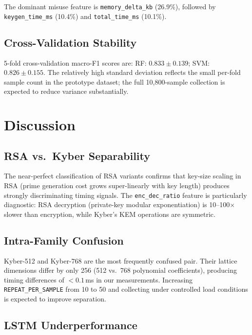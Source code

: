 \documentclass[conference]{IEEEtran}
\begin{document}
The dominant misuse feature is \texttt{memory\_delta\_kb} (26.9\%),
followed by \texttt{keygen\_time\_ms} (10.4\%) and
\texttt{total\_time\_ms} (10.1\%).

\subsection{Cross-Validation Stability}

5-fold cross-validation macro-F1 scores are:
RF: $0.833 \pm 0.139$;
SVM: $0.826 \pm 0.155$.
The relatively high standard deviation reflects the small per-fold
sample count in the prototype dataset; the full 10{,}800-sample
collection is expected to reduce variance substantially.

\section{Discussion}

\subsection{RSA vs.\ Kyber Separability}

The near-perfect classification of RSA variants confirms that key-size
scaling in RSA (prime generation cost grows super-linearly with key
length) produces strongly discriminating timing signals.
The \texttt{enc\_dec\_ratio} feature is particularly diagnostic:
RSA decryption (private-key modular exponentiation) is 10--100$\times$
slower than encryption, while Kyber's KEM operations are symmetric.

\subsection{Intra-Family Confusion}

Kyber-512 and Kyber-768 are the most frequently confused pair.
Their lattice dimensions differ by only 256 (512 vs.\ 768 polynomial
coefficients), producing timing differences of $<0.1$\,ms in our
measurements.
Increasing \texttt{REPEAT\_PER\_SAMPLE} from 10 to 50 and collecting
under controlled load conditions is expected to improve separation.

\subsection{LSTM Underperformance}
\end{document}

